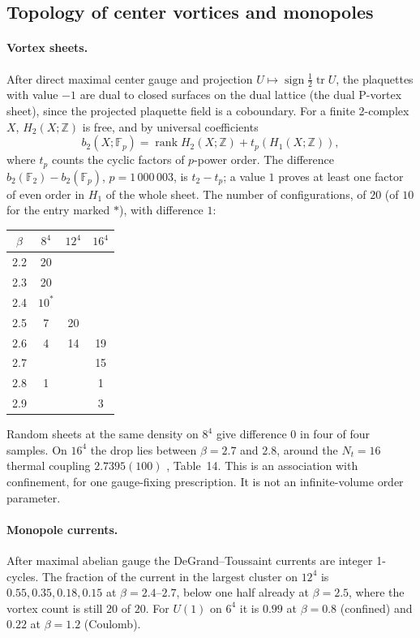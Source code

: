 \subsection{Topology of center vortices and monopoles}\label{ym:num-topology}
\paragraph{Vortex sheets.} After direct maximal center gauge
\cite{DelDebbioEtAl1997} and projection $U\mapsto\operatorname{sign}
\frac12\operatorname{tr}U$, the plaquettes with value $-1$ are dual to closed
surfaces on the dual lattice (the dual P-vortex sheet), since the projected
plaquette field is a coboundary. For a finite 2-complex $X$, $H_2(X;\mathbb Z)$
is free, and by universal coefficients
\begin{equation}\label{ym:num-betti}
 b_2(X;\mathbb F_p)=\operatorname{rank}H_2(X;\mathbb Z)+t_p(H_1(X;\mathbb Z)),
\end{equation}
where $t_p$ counts the cyclic factors of $p$-power order. The difference
$b_2(\mathbb F_2)-b_2(\mathbb F_p)$, $p=1\,000\,003$, is $t_2-t_p$; a value
$1$ proves at least one factor of even order in $H_1$ of the whole sheet. The
number of configurations, of $20$ (of $10$ for the entry marked $*$), with
difference $1$:
\begin{center}
\begin{tabular}{cccc}
$\beta$ & $8^4$ & $12^4$ & $16^4$\\\hline
2.2 & 20 & & \\
2.3 & 20 & & \\
2.4 & $10^*$ & & \\
2.5 & 7 & 20 & \\
2.6 & 4 & 14 & 19\\
2.7 & & & 15\\
2.8 & 1 & & 1\\
2.9 & & & 3
\end{tabular}
\end{center}
Random sheets at the same density on $8^4$ give difference $0$ in four of four
samples. On $16^4$ the drop lies between $\beta=2.7$ and $2.8$, around the
$N_t=16$ thermal coupling $2.7395(100)$ \cite{Teper1998}, Table~14. This is an
association with confinement, for one gauge-fixing prescription. It is not an
infinite-volume order parameter.

\paragraph{Monopole currents.} After maximal abelian gauge the
DeGrand--Toussaint currents \cite{DeGrandToussaint1980} are integer 1-cycles.
The fraction of the current in the largest cluster on $12^4$ is
$0.55,0.35,0.18,0.15$ at $\beta=2.4$--$2.7$, below one half already at
$\beta=2.5$, where the vortex count is still $20$ of $20$. For $U(1)$ on $6^4$
it is $0.99$ at $\beta=0.8$ (confined) and $0.22$ at $\beta=1.2$ (Coulomb).
